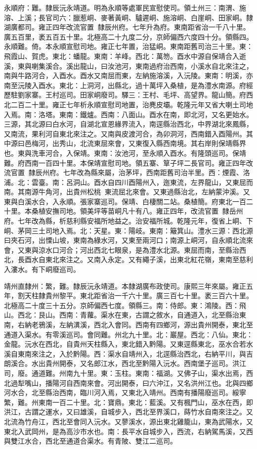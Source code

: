 \begin{pinyinscope}
永順府：難。隸辰沅永靖道。明為永順等處軍民宣慰使司。領土州三：南渭、施溶、上溪；長官司六：臘惹峒、麥著黃峒、驢遲峒、施溶峒、白崖峒、田家峒。隸湖廣都司。雍正四年改流官置，隸辰州府。七年升為府。東南距省治一千八十里。廣五百里，袤五百五十里。北極高二十九度二分，京師偏西六度四十分。領縣四。永順難。倚。本永順宣慰司地。雍正七年置，治猛峒。東南距舊司治三十里。東：飛霞山、賀虎。東北：蟠龍。東南：羊峰。西北：萬笏。酉水中源自保靖合入逝溪，東與喇集溪合。溪出龍山，曰汝池河，東南過府治西南，小溪水自北來注之，南與牛路河合，入酉水。酉水又南屈而東，左納施溶溪，入沅陵。東南：明溪，亦南至沅陵入酉水。東北：上洞河，出縣北，過十萬坪入桑植，是為澧水南源。府經歷駐劉家寨。王村巡司。田家峒廢司。驛三：王村、毛坪、高望界。龍山簡。府西北二百二十里。雍正七年析永順宣慰司地置，治麂皮壩。乾隆元年又省大喇土司地入焉。南：洛塔。東南：鐵爐。西南：八面山。酉水在南，即北河，又名更始水。三源，其北源曰白水河，自湖北宣恩緣界流入，南逕縣治西北，中界湖北來鳳縣，又南流，果利河自東北來注之。又南與皮渡河合，為卯洞河，西南錯入酉陽州。其中源曰邑梅河，出秀山，北流東屈來會，又東復入縣西南境。其右岸則保靖縣界也。東與洗車河合，入保靖。東南：汝池河，至永順入酉水。有隆頭巡司。保靖難。府西南一百四十里。本保靖宣慰司地。領五寨、筸子坪二長官司。雍正四年改流官置，隸辰州府。七年改為縣來屬，治茅坪，西南距舊司治半里。西：煙霞、洛浦。北：雲臺。南：呂洞山。酉水自四川酉陽州入，迤東流，左界龍山，又東屈而南。其南源牛角河，出貴州松桃，東流屈北來會。又東過縣治北，左納蒙沖溪。又東與白溪水合，入永順。張家寨巡司。保靖、白棲關二站。桑植簡。府東北一百二十里。本桑植安撫司地。領美坪等苗峒凡十有八。雍正四年，改流官置，隸岳州府。七年改為縣，析慈利縣安福所地益之。治安福所城。乾隆元年，復省上峒、下峒、茅岡三土司地入焉。北：天星。東：陽岐。東南：簸箕山。澧水三源：西北源曰夾石河，出慄山坡，東南為綠水河，又東至兩河口；南源上峒河，自永順北流來會，又東與涼水口河合；河出西北七眼泉，是為澧水北源。東屈而南，至縣治西北，長酉水自東北來注之。又南入永定。又有繩子溪，出東北紅花嶺，東南至慈利入漊水。有下峒廢巡司。

靖州直隸州：繁，難。隸辰沅永靖道。本隸湖廣布政使司。康熙三年來屬。雍正五年，割天柱隸貴州黎平。東北距省治一千六十里。廣三百七十里。袤三百六十里。北極高二十度三十五分。京師偏西七度。領縣三。南：侍郎。東：鴻陵。西：飛山。西北：艮山。西南：青蘿。渠水在東，古謂之敘水，自通道入，北至縣治東南，右納老鴉溪，左納潩溪，西北入會同。西南有四鄉河，源出貴州開泰，東北至通道入渠水。有零溪巡司。會同難。州北九十里。北：巖屋。西北：八仙。東北：金龍。沅水在西北，自貴州天柱縣入，東北錯入黔陽。又東逕縣東北，巫水合若水溪自東南來注之，入於黔陽。西：渠水自靖州入，北逕縣治西北，右納平川，與吉朗溪合。水出貴州開泰，又名郎江水，西北至黔陽入沅水。西南堡子巡司。洪江司，廢。通道難。州南九十里。東：玉柱。東南：福湖。又佛子山，渠水出焉，西北過犁嘴山，播陽河自西南來會。河出開泰，曰六沖江，又名洪州江也。北與四鄉河水合，北至縣治西南，臨川河入焉，又東北入靖州。西南有播陽廢巡司。綏寧繁，難。州東南一百二十里。北：寶鼎。東北：藍溪。又有楓門山，巫水在西，即洪江，古謂之運水，又曰雄溪，自城步入，西北至界溪口，蒔竹水自南來注之。又北流為竹舟江，西北至會同入沅水。又蓼溪水，源出東北雞籠山，東為武陽水，又東北入武岡州，是為高沙市水也。南：長平水自城步入，西流，右納駕馬溪，又西與雙江水合，西北至通道合渠水。有青陂、雙江二巡司。


\end{pinyinscope}
